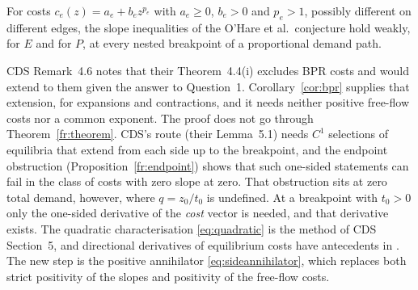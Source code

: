 \begin{corollary}\label{cor:bpr}
For costs $c_e(z)=a_e+b_ez^{p_e}$ with $a_e\ge0$, $b_e>0$ and $p_e>1$, possibly different on different edges, the slope inequalities of the O'Hare et al.\ conjecture hold weakly, for $E$ and for $P$, at every nested breakpoint of a proportional demand path.
\end{corollary}

CDS Remark~4.6 notes that their Theorem~4.4(i) excludes BPR costs and would extend to them given the answer to Question~1. Corollary~\ref{cor:bpr} supplies that extension, for expansions and contractions, and it needs neither positive free-flow costs nor a common exponent. The proof does not go through Theorem~\ref{fr:theorem}. CDS's route (their Lemma~5.1) needs $C^1$ selections of equilibria that extend from each side up to the breakpoint, and the endpoint obstruction (Proposition~\ref{fr:endpoint}) shows that such one-sided statements can fail in the class of costs with zero slope at zero. That obstruction sits at zero total demand, however, where $q=z_0/t_0$ is undefined. At a breakpoint with $t_0>0$ only the one-sided derivative of the \emph{cost} vector is needed, and that derivative exists. The quadratic characterisation \eqref{eq:quadratic} is the method of CDS Section~5, and directional derivatives of equilibrium costs have antecedents in \cite{JP2007,Patriksson2004}. The new step is the positive annihilator \eqref{eq:sideannihilator}, which replaces both strict positivity of the slopes and positivity of the free-flow costs.

